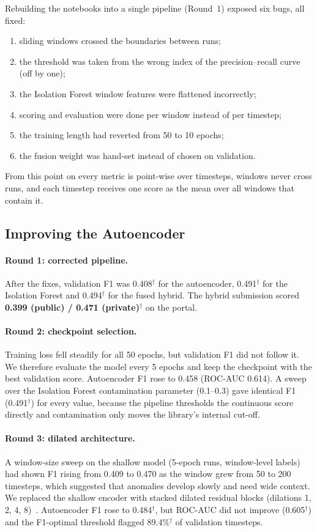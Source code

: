 \documentclass[runningheads]{llncs}
\newcommand{\doc}{$^\dagger$}
\begin{document}
Rebuilding the notebooks into a single pipeline (Round~1) exposed six bugs, all fixed:
\begin{enumerate}
  \item sliding windows crossed the boundaries between runs;
  \item the threshold was taken from the wrong index of the precision--recall curve (off by one);
  \item the Isolation Forest window features were flattened incorrectly;
  \item scoring and evaluation were done per window instead of per timestep;
  \item the training length had reverted from 50 to 10 epochs;
  \item the fusion weight was hand-set instead of chosen on validation.
\end{enumerate}
From this point on every metric is point-wise over timesteps, windows never cross runs, and each timestep receives one score as the mean over all windows that contain it.

\subsection{Improving the Autoencoder}

\paragraph{Round 1: corrected pipeline.} After the fixes, validation F1 was 0.408\doc{} for the autoencoder, 0.491\doc{} for the Isolation Forest and 0.494\doc{} for the fused hybrid. The hybrid submission scored \textbf{0.399 (public) / 0.471 (private)}\doc{} on the portal.

\paragraph{Round 2: checkpoint selection.} Training loss fell steadily for all 50 epochs, but validation F1 did not follow it. We therefore evaluate the model every 5 epochs and keep the checkpoint with the best validation score. Autoencoder F1 rose to 0.458 (ROC-AUC 0.614). A sweep over the Isolation Forest contamination parameter (0.1--0.3) gave identical F1 (0.491\doc) for every value, because the pipeline thresholds the continuous score directly and contamination only moves the library's internal cut-off.

\paragraph{Round 3: dilated architecture.} A window-size sweep on the shallow model (5-epoch runs, window-level labels) had shown F1 rising from 0.409 to 0.470 as the window grew from 50 to 200 timesteps, which suggested that anomalies develop slowly and need wide context. We replaced the shallow encoder with stacked dilated residual blocks (dilations 1, 2, 4, 8)~\cite{bai2018empirical,oord2016wavenet}. Autoencoder F1 rose to 0.484\doc, but ROC-AUC did not improve (0.605\doc) and the F1-optimal threshold flagged 89.4\%\doc{} of validation timesteps.
\end{document}
